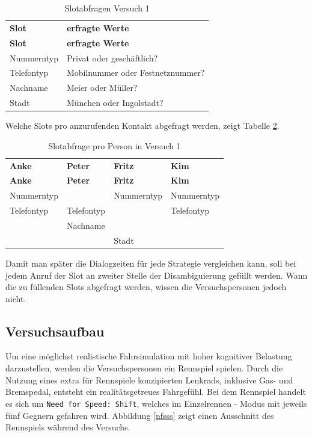 \documentclass[12pt,a4paper]{scrartcl}
\begin{document}
\begin{longtable}{p{6cm}p{8cm}}
	\label{slots}\\
	\caption[Slotabfragen Versuch 1]{Slotabfragen Versuch 1}\\
	\hline
	\textbf{Slot} &	\textbf{erfragte Werte}\\
	\hline
	\endfirsthead
	\hline
	\textbf{Slot} &	\textbf{erfragte Werte}\\
	\hline
	\endhead
Nummerntyp & Privat oder geschäftlich?\\
Telefontyp & Mobilnummer oder Festnetznummer?\\
Nachname & Meier oder Müller?\\
Stadt & München oder Ingolstadt?\\


\hline
\end{longtable}

Welche Slots pro anzurufenden Kontakt abgefragt werden, zeigt Tabelle \ref{slotsPerson}. 

\begin{longtable}{p{}p{}p{}p{}}
	\label{slotsPerson}\\
	\caption[Slotabfrage pro Person in Versuch 1]{Slotabfrage pro Person in Versuch 1}\\
	\hline
	\textbf{Anke}&\textbf{Peter}&\textbf{Fritz} &\textbf{Kim}\\
	\hline
	\endfirsthead
	\hline
	\textbf{Anke}&\textbf{Peter}&\textbf{Fritz} &\textbf{Kim}\\
	\hline
	\endhead
Nummerntyp & & Nummerntyp & Nummerntyp\\
Telefontyp & Telefontyp & & Telefontyp \\
& Nachname & & \\
& & Stadt & \\

\hline
\end{longtable}

Damit man später die Dialogzeiten für jede Strategie vergleichen kann, soll bei jedem Anruf der Slot an zweiter Stelle der Disambiguierung gefüllt werden. Wann die zu füllenden Slots abgefragt werden, wissen die Versuchspersonen jedoch nicht.  

\subsection{Versuchsaufbau}
Um eine möglichst realistische Fahrsimulation mit hoher kognitiver Belastung darzustellen, werden die Versuchspersonen ein Rennspiel spielen. Durch die Nutzung eines extra für Rennspiele konzipierten Lenkrads, inklusive Gas- und Bremspedal, entsteht ein realitätsgetreues Fahrgefühl. Bei dem Rennspiel handelt es sich um \texttt{Need for Speed: Shift}, welches im Einzelrennen - Modus mit jeweils fünf Gegnern gefahren wird. Abbildung \ref{nfsss} zeigt einen Ausschnitt des Rennspiels während des Versuchs. 
\end{document}

